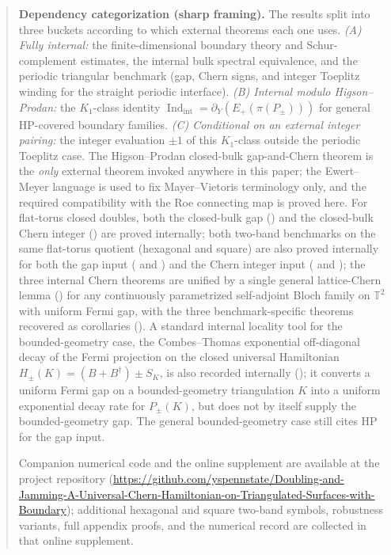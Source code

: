 \documentclass[11pt]{article}
\numberwithin{equation}{section}
\theoremstyle{definition}
\theoremstyle{remark}
\newcommand{\Indint}{\operatorname{Ind}_{\mathrm{int}}}
\begin{document}
\begin{abstract}
\medskip\noindent
\textbf{Dependency categorization (sharp framing).} The results split into three buckets
according to which external theorems each one uses. \emph{(A) Fully internal:} the
finite-dimensional boundary theory and Schur-complement estimates, the internal bulk spectral
equivalence, and the periodic triangular benchmark (gap, Chern signs, and integer Toeplitz
winding for the straight periodic interface). \emph{(B) Internal modulo Higson--Prodan:} the
\(K_1\)-class identity \(\Indint=\partial_Y(E_+(\pi(P_\pm)))\) for general HP-covered boundary
families. \emph{(C) Conditional on an external integer pairing:} the integer evaluation
\(\pm 1\) of this \(K_1\)-class outside the periodic Toeplitz case. The Higson--Prodan
closed-bulk gap-and-Chern theorem is the \emph{only} external theorem invoked anywhere in this
paper; the Ewert--Meyer language is used to fix Mayer--Vietoris terminology only, and the
required compatibility with the Roe connecting map is proved here. For flat-torus closed
doubles, both the closed-bulk gap () and the closed-bulk Chern
integer () are proved internally; both two-band benchmarks
on the same flat-torus quotient (hexagonal and square) are also proved internally for both the
gap input ( and ) and the Chern
integer input ( and ); the
three internal Chern theorems are unified by a single general lattice-Chern lemma
() for any continuously parametrized self-adjoint Bloch
family on \(\mathbb T^2\) with uniform Fermi gap, with the three benchmark-specific theorems
recovered as corollaries
().
A standard internal locality tool for the bounded-geometry case, the Combes--Thomas
exponential off-diagonal decay of the Fermi projection on the closed universal Hamiltonian
\(H_\pm(K)=(B+B^\dagger)\pm S_K\), is also recorded internally
(); it converts a uniform Fermi gap on a bounded-geometry
triangulation \(K\) into a uniform exponential decay rate for \(P_\pm(K)\), but does not by
itself supply the bounded-geometry gap. The general bounded-geometry case still cites HP for
the gap input.

\medskip
\noindent Companion
numerical code and the online supplement are available at the project repository
(\url{https://github.com/yspennstate/Doubling-and-Jamming-A-Universal-Chern-Hamiltonian-on-Triangulated-Surfaces-with-Boundary});
additional hexagonal and square two-band symbols, robustness variants, full appendix proofs,
and the numerical record are collected in that online supplement.
\end{abstract}
\end{document}
